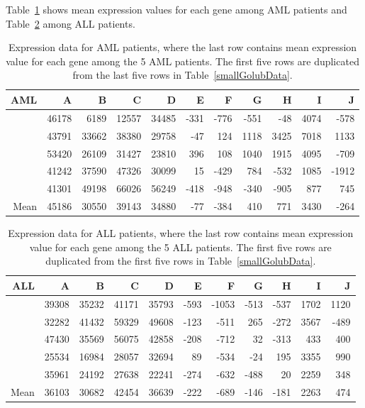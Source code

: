Table~\ref{golubSmallAml} shows mean expression values for each gene among AML patients and Table~\ref{golubSmallAll} among ALL patients. 

\begin{table}[ht]
	\small
	\centering
	\begin{tabular}{r|rrrrrrrrrr}
		\hline
		AML & A & B & C & D & E & F & G & H & I & J \\ 
		\hline
		& 46178 & 6189 & 12557 & 34485 & -331 & -776 & -551 & -48 & 4074 & -578 \\ 
		& 43791 & 33662 & 38380 & 29758 & -47 & 124 & 1118 & 3425 & 7018 & 1133 \\ 
		& 53420 & 26109 & 31427 & 23810 & 396 & 108 & 1040 & 1915 & 4095 & -709 \\ 
		& 41242 & 37590 & 47326 & 30099 & 15 & -429 & 784 & -532 & 1085 & -1912 \\ 
		& 41301 & 49198 & 66026 & 56249 & -418 & -948 & -340 & -905 & 877 & 745 \\ 
		\hline
		Mean & 45186 & 30550 & 39143 & 34880 & -77 & -384 & 410 & 771 & 3430 & -264 \\ 
		\hline
	\end{tabular}
	\caption{Expression data for AML patients, where the last row contains mean expression value for each gene among the 5 AML patients. The first five rows are duplicated from the last five rows in Table~\ref{smallGolubData}.}
	\label{golubSmallAml}
\end{table}

\begin{table}[ht]
	\small
	\centering
	\begin{tabular}{r|rrrrrrrrrr}
		\hline
		ALL & A & B & C & D & E & F & G & H & I & J \\ 
		\hline
		& 39308 & 35232 & 41171 & 35793 & -593 & -1053 & -513 & -537 & 1702 & 1120 \\ 
		& 32282 & 41432 & 59329 & 49608 & -123 & -511 & 265 & -272 & 3567 & -489 \\ 
		& 47430 & 35569 & 56075 & 42858 & -208 & -712 & 32 & -313 & 433 & 400 \\ 
		& 25534 & 16984 & 28057 & 32694 & 89 & -534 & -24 & 195 & 3355 & 990 \\ 
		& 35961 & 24192 & 27638 & 22241 & -274 & -632 & -488 & 20 & 2259 & 348 \\ 
		\hline
		Mean & 36103 & 30682 & 42454 & 36639 & -222 & -689 & -146 & -181 & 2263 & 474 \\ 
		\hline
	\end{tabular}
	\caption{Expression data for ALL patients, where the last row contains mean expression value for each gene among the 5 ALL patients. The first five rows are duplicated from the first five rows in Table~\ref{smallGolubData}.}
	\label{golubSmallAll}
\end{table}

